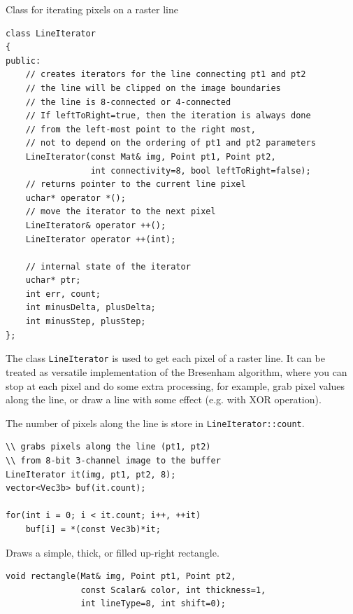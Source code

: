 \label{LineIterator}
Class for iterating pixels on a raster line

\begin{lstlisting}
class LineIterator
{
public:
    // creates iterators for the line connecting pt1 and pt2
    // the line will be clipped on the image boundaries
    // the line is 8-connected or 4-connected
    // If leftToRight=true, then the iteration is always done
    // from the left-most point to the right most,
    // not to depend on the ordering of pt1 and pt2 parameters
    LineIterator(const Mat& img, Point pt1, Point pt2,
                 int connectivity=8, bool leftToRight=false);
    // returns pointer to the current line pixel
    uchar* operator *();
    // move the iterator to the next pixel
    LineIterator& operator ++();
    LineIterator operator ++(int);

    // internal state of the iterator
    uchar* ptr;
    int err, count;
    int minusDelta, plusDelta;
    int minusStep, plusStep;
};
\end{lstlisting}

The class \texttt{LineIterator} is used to get each pixel of a raster line. It can be treated as versatile implementation of the Bresenham algorithm, where you can stop at each pixel and do some extra processing, for example, grab pixel values along the line, or draw a line with some effect (e.g. with XOR operation).

The number of pixels along the line is store in \texttt{LineIterator::count}.

\begin{lstlisting}
\\ grabs pixels along the line (pt1, pt2)
\\ from 8-bit 3-channel image to the buffer
LineIterator it(img, pt1, pt2, 8);
vector<Vec3b> buf(it.count);

for(int i = 0; i < it.count; i++, ++it)
    buf[i] = *(const Vec3b)*it;
\end{lstlisting}


\label{rectangle}
Draws a simple, thick, or filled up-right rectangle.

\begin{lstlisting}
void rectangle(Mat& img, Point pt1, Point pt2,
               const Scalar& color, int thickness=1,
               int lineType=8, int shift=0);
\end{lstlisting}
\begin{description}
\end{description}

